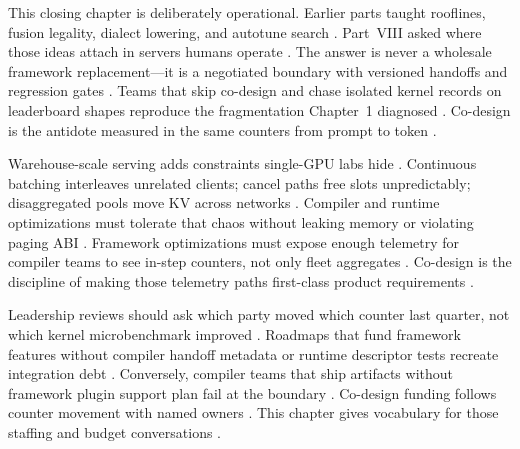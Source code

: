 This closing chapter is deliberately operational. Earlier parts taught rooflines, fusion legality, dialect lowering, and autotune search \citep{chen2020compilerbasedhardw,yirage2026,semianalysis2024tma,patel2025llminference,dlbook}. Part~VIII asked where those ideas attach in servers humans operate \citep{kwon2023vllm,yirage2026,chen2020compilerbasedhardw,patel2025llminference,taxbreak2026,memoryfloor2026,dlbook}. The answer is never a wholesale framework replacement---it is a negotiated boundary with versioned handoffs and regression gates \citep{patel2025llminference,yirage2026,chen2020compilerbasedhardw,kwon2023vllm,dlbook}. Teams that skip co-design and chase isolated kernel records on leaderboard shapes reproduce the fragmentation Chapter~1 diagnosed \citep{taxbreak2026,memoryfloor2026,patel2025llminference,yirage2026,chen2020compilerbasedhardw,dlbook}. Co-design is the antidote measured in the same counters from prompt to token \citep{patel2025llminference,taxbreak2026,memoryfloor2026,yirage2026,chen2020compilerbasedhardw,kwon2023vllm,dlbook}.

Warehouse-scale serving adds constraints single-GPU labs hide \citep{patel2025llminference,kwon2023vllm,yirage2026,chen2020compilerbasedhardw,dlbook}. Continuous batching interleaves unrelated clients; cancel paths free slots unpredictably; disaggregated pools move KV across networks \citep{kwon2023vllm,liu2024deepseekv3,patel2025llminference,yirage2026,chen2020compilerbasedhardw,dlbook}. Compiler and runtime optimizations must tolerate that chaos without leaking memory or violating paging ABI \citep{kwon2023vllm,yirage2026,chen2020compilerbasedhardw,patel2025llminference,memoryfloor2026,taxbreak2026,dlbook}. Framework optimizations must expose enough telemetry for compiler teams to see in-step counters, not only fleet aggregates \citep{patel2025llminference,yirage2026,chen2020compilerbasedhardw,kwon2023vllm,taxbreak2026,memoryfloor2026,dlbook}. Co-design is the discipline of making those telemetry paths first-class product requirements \citep{patel2025llminference,yirage2026,chen2020compilerbasedhardw,dlbook}.

Leadership reviews should ask which party moved which counter last quarter, not which kernel microbenchmark improved \citep{patel2025llminference,taxbreak2026,memoryfloor2026,yirage2026,chen2020compilerbasedhardw,dlbook}. Roadmaps that fund framework features without compiler handoff metadata or runtime descriptor tests recreate integration debt \citep{kwon2023vllm,yirage2026,chen2020compilerbasedhardw,patel2025llminference,dlbook}. Conversely, compiler teams that ship artifacts without framework plugin support plan fail at the boundary \citep{patel2025llminference,yirage2026,chen2020compilerbasedhardw,kwon2023vllm,dlbook}. Co-design funding follows counter movement with named owners \citep{taxbreak2026,memoryfloor2026,patel2025llminference,yirage2026,chen2020compilerbasedhardw,dlbook}. This chapter gives vocabulary for those staffing and budget conversations \citep{patel2025llminference,yirage2026,chen2020compilerbasedhardw,kwon2023vllm,dlbook}.

